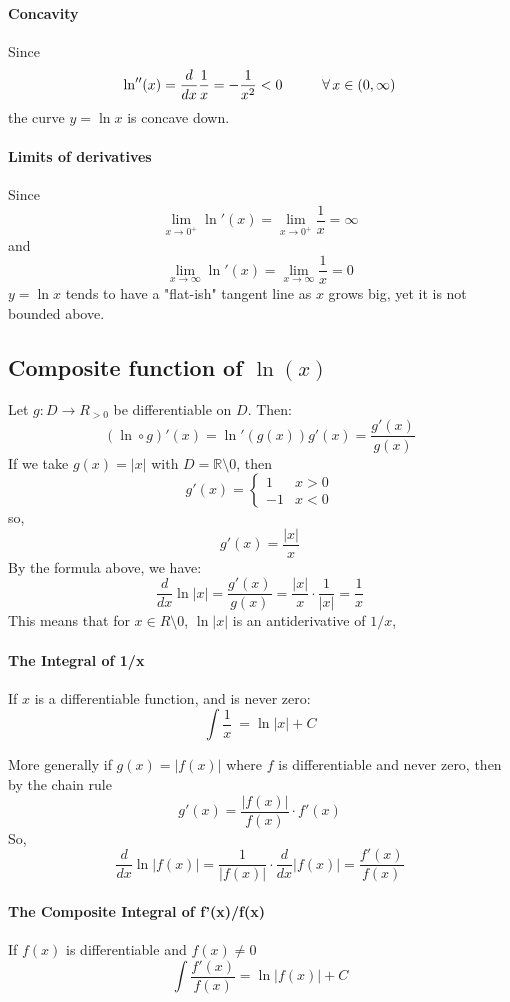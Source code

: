 \documentclass[12pt]{article}
\newcommand\tab[1][1cm]{\hspace*{#1}}
\begin{document}
\paragraph{Concavity} Since
\[
    \ln''(x) = \frac{d}{dx} \frac{1}{x} = - \frac{1}{x^2} < 0 \textrm{\tab} \forall \, x \in (0, \infty)
\]
the curve $y = \ln x$ is concave down.

\paragraph{Limits of derivatives}
Since
\[
    \lim_{x \to 0^{ +}} \ln'(x) = \lim_{x \to 0^{ +}} \frac{1}{x} = \infty
\]
and
\[
    \lim_{x \to \infty} \ln'(x) = \lim_{x \to \infty} \frac{1}{x} = 0 
\]
$y = \ln x$ tends to have a "flat-ish" tangent line as $x$ grows big, yet it is not bounded above.
\subsection{Composite function of $\ln(x)$}
Let $g: D \to R_{>0}$ be differentiable on $D$. Then:
\[
    (\ln \circ g)'(x) = \ln'(g(x))g'(x) = \frac{g'(x)}{g(x)}
\]
If we take $g(x) = |x|$ with $D = \mathbb{R} \setminus {0}$, then 
\[
    g'(x) = 
    \begin{cases}
        1 & x > 0 \\
        - 1 & x < 0
    \end{cases} 
\]
so,
\[
    g'(x) = \frac{|x|}{x} 
\]
By the formula above, we have:
\[
    \frac{d}{dx} \ln |x| = \frac{g'(x)}{g(x)} = \frac{|x|}{x} \cdot \frac{1}{|x|} = \frac{1}{x}
\]
This means that for $x \in R \setminus{0}$, $\ln |x|$ is an antiderivative of $1/x$, 

\paragraph{The Integral of 1/x}
If $x$ is a differentiable function, and is never zero:
\[
    \int \frac{1}{x} \: = \ln |x| + C
\]

\noindent
More generally if $g(x) = |f(x)|$ where $f$ is differentiable and never zero, then by the chain rule 
\[
    g'(x) = \frac{|f(x)|}{f(x)} \cdot f'(x) 
\]
So, 
\[
    \frac{d}{dx} \ln |f(x)| = \frac{1}{|f(x)|} \cdot \frac{d}{dx} |f(x)| = \frac{f'(x)}{f(x)} 
\]

\paragraph{The Composite Integral of f'(x)/f(x)}
If $f(x)$ is differentiable and $f(x) \neq 0$
\[
    \int \frac{f'(x)}{f(x)} = \ln |f(x)| + C 
\]
\end{document}
